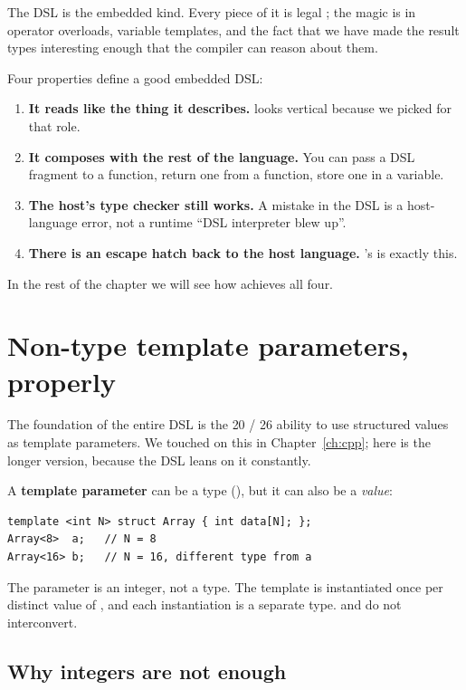 The \maya{} DSL is the embedded kind. Every piece of it is legal
\cpp{}; the magic is in operator overloads, variable templates, and
the fact that we have made the result types interesting enough that
the compiler can reason about them.

Four properties define a good embedded DSL:

\begin{enumerate}[leftmargin=*]
  \item \textbf{It reads like the thing it describes.}
     looks vertical because we picked
     for that role.
  \item \textbf{It composes with the rest of the language.} You can
    pass a DSL fragment to a function, return one from a function,
    store one in a variable.
  \item \textbf{The host's type checker still works.} A mistake in
    the DSL is a host-language error, not a runtime ``DSL
    interpreter blew up''.
  \item \textbf{There is an escape hatch back to the host
    language.} \maya{}'s  is exactly this.
\end{enumerate}

In the rest of the chapter we will see how \maya{} achieves all four.

\section{Non-type template parameters, properly}
\label{sec:dsl:nttp}

The foundation of the entire DSL is the \cpp{}20 / 26 ability to use
structured values as template parameters. We touched on this in
Chapter~\ref{ch:cpp}; here is the longer version, because the DSL
leans on it constantly.

A \textbf{template parameter} can be a type (), but
it can also be a \emph{value}:

\begin{lstlisting}
template <int N> struct Array { int data[N]; };
Array<8>  a;   // N = 8
Array<16> b;   // N = 16, different type from a
\end{lstlisting}

The parameter  is an integer, not a type. The template is
instantiated once per distinct value of , and each
instantiation is a separate type.  and 
do not interconvert.

\subsection{Why integers are not enough}


